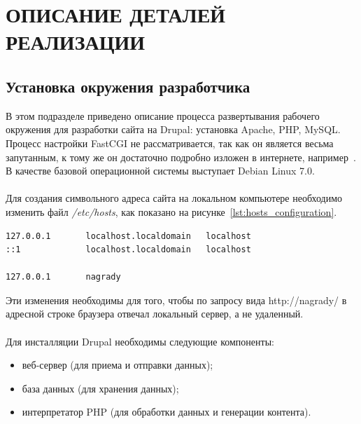 \section[Описание деталей реализации]{ОПИСАНИЕ ДЕТАЛЕЙ РЕАЛИЗАЦИИ}
\label{sec:realization}

\subsection{Установка окружения разработчика}
\label{ssec:dev_installation}

В этом подразделе приведено описание процесса развертывания рабочего окружения 
для разработки сайта на Drupal: установка Apache, PHP, MySQL.
Процесс настройки FastCGI не рассматривается, так как он является
весьма запутанным, к тому же он достаточно подробно изложен в
интернете, например~\cite{fast_cgi_conf}.
В качестве базовой операционной системы выступает Debian Linux 7.0. 

\paragraph{}
Для создания символьного адреса сайта на локальном компьютере
необходимо изменить файл \textit{/etc/hosts}, как показано на рисунке~\ref{lst:hosts_configuration}.

\begin{lstlisting}[language=bash,
  caption=Содержимое файла \textit{/etc/hosts},
  label=lst:hosts_configuration]
127.0.0.1       localhost.localdomain   localhost
::1             localhost.localdomain   localhost

127.0.0.1       nagrady
\end{lstlisting}

Эти изменения необходимы для того, чтобы по запросу вида http://nagrady/
в адресной строке браузера отвечал локальный сервер, а не удаленный.

\paragraph{}
Для инсталляции Drupal необходимы следующие компоненты:

\begin{itemize}
\item
  веб-сервер (для приема и отправки данных);
\item
  база данных (для хранения данных);
\item
  интерпретатор PHP (для обработки данных и генерации контента).
\end{itemize}


